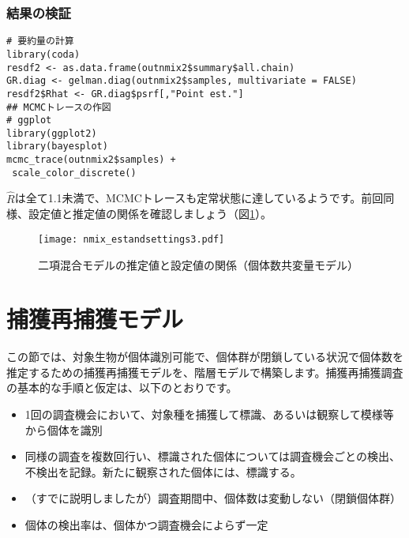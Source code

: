 		\subsubsection{結果の検証}
\begin{verbatim}
# 要約量の計算
library(coda)
resdf2 <- as.data.frame(outnmix2$summary$all.chain)
GR.diag <- gelman.diag(outnmix2$samples, multivariate = FALSE)
resdf2$Rhat <- GR.diag$psrf[,"Point est."]
## MCMCトレースの作図
# ggplot
library(ggplot2)
library(bayesplot)
mcmc_trace(outnmix2$samples) +
 scale_color_discrete()
\end{verbatim}
$\hat{R}$は全て1.1未満で、MCMCトレースも定常状態に達しているようです。前回同様、設定値と推定値の関係を確認しましょう（図\ref{nmix_estandsettings3}）。
\begin{figure}[htb]
\begin{center}
\graphicspath{{4_hm/figs/}}
\texttt{[image: nmix\_estandsettings3.pdf]}\\
\caption{二項混合モデルの推定値と設定値の関係（個体数共変量モデル）}
\label{nmix_estandsettings3}
\end{center}
\end{figure}

\clearpage
\section{捕獲再捕獲モデル}
この節では、対象生物が個体識別可能で、個体群が閉鎖している状況で個体数を推定するための捕獲再捕獲モデルを、階層モデルで構築します。捕獲再捕獲調査の基本的な手順と仮定は、以下のとおりです。
\begin{itemize}
	\item 1回の調査機会において、対象種を捕獲して標識、あるいは観察して模様等から個体を識別
	\item 同様の調査を複数回行い、標識された個体については調査機会ごとの検出、不検出を記録。新たに観察された個体には、標識する。
	\item （すでに説明しましたが）調査期間中、個体数は変動しない（閉鎖個体群）
	\item 個体の検出率は、個体かつ調査機会によらず一定
\end{itemize}
